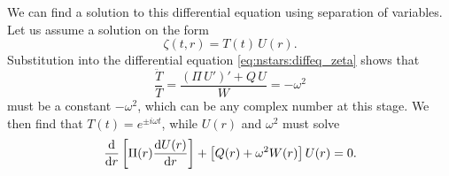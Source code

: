 We can find a solution to this differential equation using separation of variables.
Let us assume a solution on the form
\begin{equation}
	\zeta(t,r) = T(t) \, U(r) .
\label{eq:nstars:separation_of_variables}
\end{equation}
Substitution into the differential equation \eqref{eq:nstars:diffeq_zeta} shows that
\begin{equation}
	\frac{\ddot{T}}{T} = \frac{\left( \Pi \, U' \right)' + Q \, U}{W} = -\omega^2
\end{equation}
must be a constant $-\omega^2$, which can be any complex number at this stage.
We then find that $T(t) = e^{\pm i \omega t}$, while $U(r)$ and $\omega^2$ must solve
\begin{equation}
	\odv*{ \left[ \Pi(r) \odv{U(r)}{r} \right] }{r} + \left[ Q(r) + \omega^2 W(r) \right] U(r) = 0 .
\label{eq:nstars:diffeq_U}
\end{equation}

